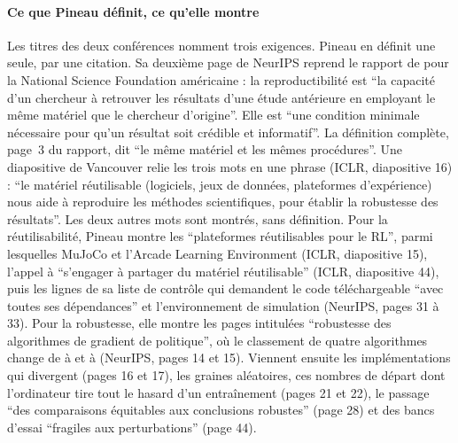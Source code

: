 \paragraph{Ce que Pineau définit, ce qu'elle montre}
Les titres des deux conférences nomment trois exigences. Pineau en définit une seule, par une citation.
Sa deuxième page de NeurIPS reprend le rapport de \textcite{bollen2015robust} pour la National Science
Foundation américaine : la reproductibilité est \enquote{la capacité d'un chercheur à retrouver les
résultats d'une étude antérieure en employant le même matériel que le chercheur d'origine}. Elle est
\enquote{une condition minimale nécessaire pour qu'un résultat soit crédible et informatif}. La
définition complète, page~3 du rapport, dit \enquote{le même matériel et les mêmes procédures}. Une
diapositive de Vancouver relie les trois mots en une phrase (ICLR, diapositive 16) : \enquote{le matériel
réutilisable (logiciels, jeux de données, plateformes d'expérience) nous aide à reproduire les méthodes
scientifiques, pour établir la robustesse des résultats}. Les deux autres mots sont montrés, sans
définition. Pour la réutilisabilité, Pineau montre les \enquote{plateformes réutilisables pour le RL}, parmi
lesquelles MuJoCo et l'Arcade Learning Environment (ICLR, diapositive 15), l'appel à \enquote{s'engager à partager
du matériel réutilisable} (ICLR, diapositive 44), puis les lignes de sa liste de contrôle qui demandent
le code téléchargeable \enquote{avec toutes ses dépendances} et l'environnement de simulation (NeurIPS,
pages 31 à 33). Pour la robustesse, elle montre les pages intitulées \enquote{robustesse des algorithmes de
gradient de politique}, où le classement de quatre algorithmes change de  à
 et à  (NeurIPS, pages 14 et 15). Viennent ensuite les implémentations qui
divergent (pages 16 et 17), les graines aléatoires, ces nombres de départ dont l'ordinateur tire tout le
hasard d'un entraînement (pages 21 et 22), le passage \enquote{des comparaisons
équitables aux conclusions robustes} (page 28) et des bancs d'essai \enquote{fragiles aux perturbations}
(page 44).

